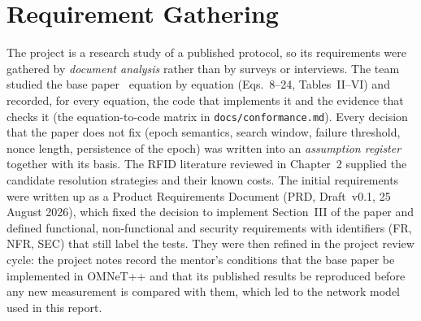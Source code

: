 \section{Requirement Gathering}
The project is a research study of a published protocol, so its requirements were gathered by \emph{document analysis} rather than by surveys or interviews. The team studied the base paper~\cite{base} equation by equation (Eqs.~8--24, Tables~II--VI) and recorded, for every equation, the code that implements it and the evidence that checks it (the equation-to-code matrix in \texttt{docs/conformance.md}). Every decision that the paper does not fix (epoch semantics, search window, failure threshold, nonce length, persistence of the epoch) was written into an \emph{assumption register} together with its basis. The RFID literature reviewed in Chapter~2 supplied the candidate resolution strategies and their known costs. The initial requirements were written up as a Product Requirements Document (PRD, Draft~v0.1, 25 August 2026), which fixed the decision to implement Section~III of the paper and defined functional, non-functional and security requirements with identifiers (FR, NFR, SEC) that still label the tests. They were then refined in the project review cycle: the project notes record the mentor's conditions that the base paper be implemented in OMNeT++ and that its published results be reproduced before any new measurement is compared with them, which led to the network model used in this report.


